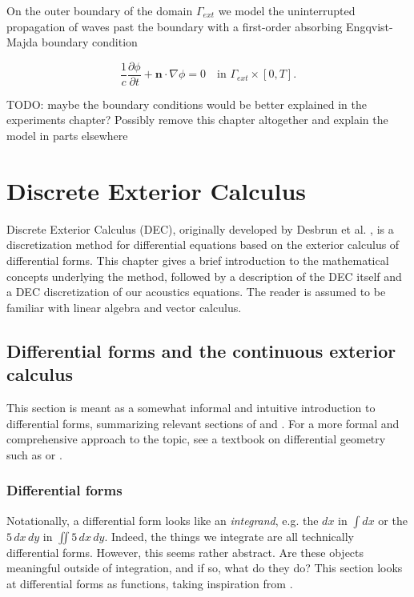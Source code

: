 \documentclass[utf8,english]{gradu3}
\begin{document}
On the outer boundary of the domain $\Gamma_{ext}$
we model the uninterrupted propagation of waves past the boundary
with a first-order absorbing Engqvist-Majda boundary condition
\parencite{engquist_absorbing_1977}

\[
  \frac{1}{c}\frac{\partial\phi}{\partial t} + \mathbf{n} \cdot \nabla\phi = 0
  \quad \text{in } \Gamma_{ext} \times [0, T].
\]


TODO: maybe the boundary conditions would be better explained
in the experiments chapter?
Possibly remove this chapter altogether
and explain the model in parts elsewhere



\chapter{Discrete Exterior Calculus}

Discrete Exterior Calculus (DEC),
originally developed by Desbrun et al. \parencite*{desbrun_discrete_2005},
is a discretization method for differential equations
based on the exterior calculus of differential forms.
This chapter gives a brief introduction to the mathematical concepts
underlying the method, followed by a description of the DEC itself
and a DEC discretization of our acoustics equations.
The reader is assumed to be familiar with linear algebra and vector calculus.


\section{Differential forms and the continuous exterior calculus}

This section is meant as a somewhat informal and intuitive introduction
to differential forms, summarizing relevant sections of
\parencite{blair_perot_differential_2014} and \parencite{crane_digital_2013}.
For a more formal and comprehensive approach to the topic,
see a textbook on differential geometry such as \parencite{lee_introduction_2012}
or \parencite{abraham_manifolds_2012}.


\subsection{Differential forms}

Notationally, a differential form looks like an \textit{integrand},
e.g. the $dx$ in $\int dx$ or the $5\,dx\,dy$ in $\iint 5\,dx\,dy$.
Indeed, the things we integrate are all technically differential forms.
However, this seems rather abstract.
Are these objects meaningful outside of integration,
and if so, what do they do?
This section looks at differential forms as functions,
taking inspiration from \parencite{crane_digital_2013}.
\end{document}
